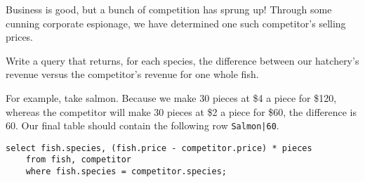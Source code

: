 \begin{blocksection}
\question Business is good, but a bunch of competition has sprung up! Through some cunning corporate espionage, we have determined one such competitor's selling prices.

Write a query that returns, for each species, the difference between our hatchery's revenue versus the competitor's revenue for one whole fish. 

For example, take salmon. Because we make 30 pieces at \$4 a piece for \$120, whereas the competitor will make 30 pieces at \$2 a piece for \$60, the difference is 60. Our final table should contain the following row \lstinline$Salmon|60$.

\begin{solution}[1.5in]
\begin{lstlisting}
select fish.species, (fish.price - competitor.price) * pieces
    from fish, competitor
    where fish.species = competitor.species;
\end{lstlisting}
\end{solution}
\end{blocksection}
